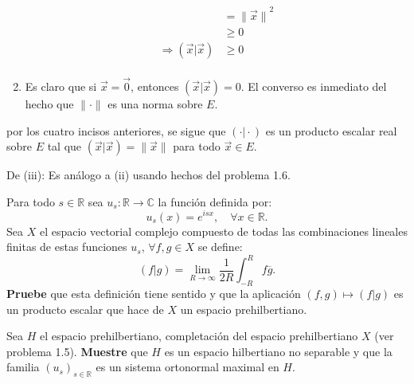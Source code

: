 \documentclass[12pt]{report}
\theoremstyle{largebreak}
\newcommand\cf[3]{\ensuremath{#1:#2\rightarrow#3}}
\newcommand\pint[2]{\ensuremath{\left(#1\big|#2\right)}}
\newcommand\conj[1]{\ensuremath{\overline{#1}}}
\newcommand\norm[1]{\ensuremath{\|#1\|}}
\begin{document}
\begin{sol}
\begin{enumerate}
\begin{equation*}
\begin{split}
                    &=\norm{\vec{x}}^2\\
                    &\geq0\\
                    \Rightarrow \pint{\vec{x}}{\vec{x}}&\geq 0\\
                \end{split}
            \end{equation*}
            \item Es claro que si $\vec{x}=\vec{0}$, entonces $\pint{\vec{x}}{\vec{x}}=0$. El converso es inmediato del hecho que $\norm{\cdot}$ es una norma sobre $E$.
        \end{enumerate}
        por los cuatro incisos anteriores, se sigue que $\pint{\cdot}{\cdot}$ es un producto escalar real sobre $E$ tal que $\pint{\vec{x}}{\vec{x}}=\norm{\vec{x}}$ para todo $\vec{x}\in E$.

        De (iii): Es análogo a (ii) usando hechos del problema 1.6.
    \end{sol}

    \begin{excer}
        Para todo $s\in\mathbb{R}$ sea $\cf{u_s}{\mathbb{R}}{\mathbb{C}}$ la función definida por:
        \begin{equation*}
            u_s(x)=e^{isx},\quad\forall x\in\mathbb{R}.
        \end{equation*}
        Sea $X$ el espacio vectorial complejo compuesto de todas las combinaciones lineales finitas de estas funciones $u_s$, $\forall f,g\in X$ se define:
        \begin{equation*}
            \pint{f}{g}=\lim_{R\rightarrow\infty}\frac{1}{2R}\int_{-R}^Rf\conj{g}.
        \end{equation*}
        \textbf{Pruebe} que esta definición tiene sentido y que la aplicación $(f,g)\mapsto\pint{f}{g}$ es un producto escalar que hace de $X$ un espacio prehilbertiano.

        Sea $H$ el espacio prehilbertiano, completación del espacio prehilbertiano $X$ (ver problema 1.5). \textbf{Muestre} que $H$ es un espacio hilbertiano no separable y que la familia $\left(u_s\right)_{s\in\mathbb{R}}$ es un sistema ortonormal maximal en $H$.
    \end{excer}
\end{document}
